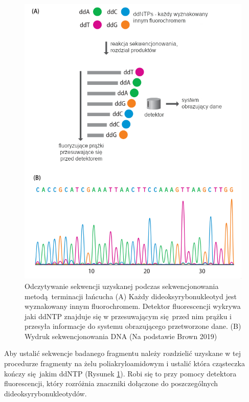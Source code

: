 \documentclass[two column, twoside, a4paper]{article}
\begin{document}
\begin{figure}[h]
\begin{tcolorbox}
	\centering
	\includegraphics[width=\textwidth]{./figury/sekwencja_metoda_terminacji.png}
	\caption{Odczytywanie sekwencji uzyskanej podczas sekwencjonowania metodą terminacji łańcucha (A) Każdy dideoksyrybonukleotyd jest wyznakowany innym fluorochromem. Detektor fluorescencji wykrywa jaki ddNTP znajduje się w przesuwającym się przed nim prążku i przesyła informacje do systemu obrazującego przetworzone dane. (B) Wydruk sekwencjonowania DNA (Na podstawie Brown 2019)}\label{fig::seq_chain_term}
\end{tcolorbox}
\end{figure}

Aby ustalić sekwencje badanego fragmentu należy rozdzielić uzyskane w tej procedurze fragmenty na żelu poliakryloamidowym i ustalić która cząsteczka kończy się jakim ddNTP (Rysunek \ref{fig::seq_chain_term}). Robi się to przy pomocy detektora fluorescencji, który rozróżnia znaczniki dołączone do poszczególnych dideoksyrybonukleotydów.
\end{document}
